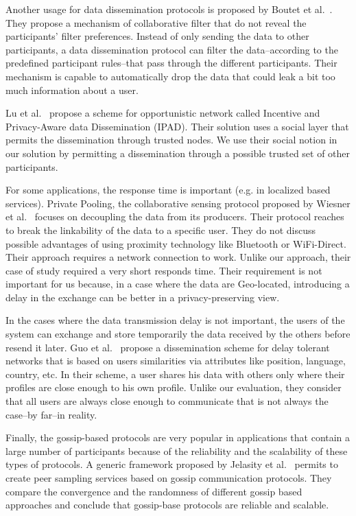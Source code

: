 Another usage for data dissemination protocols is proposed by Boutet et al.~\cite{DBLP:journals/computing/BoutetFGJK16}.
They propose a mechanism of collaborative filter that do not reveal the participants' filter preferences.
Instead of only sending the data to other participants, a data dissemination protocol can filter the data--according to the predefined participant rules--that pass through the different participants.
Their mechanism is capable to automatically drop the data that could leak a bit too much information about a user.

Lu et al.~\cite{DBLP:conf/infocom/LuLSCS13} propose a scheme for opportunistic network called Incentive and Privacy-Aware data Dissemination (IPAD).
Their solution uses a social layer that permits the dissemination through trusted nodes.
We use their social notion in our solution by permitting a dissemination through a possible trusted set of other participants.

For some applications, the response time is important (e.g. in localized based services).
Private Pooling, the collaborative sensing protocol proposed by Wiesner et al.~\cite{DBLP:conf/mobisec/WiesnerDD11} focuses on decoupling the data from its producers.
Their protocol reaches to break the linkability of the data to a specific user.
They do not discuss possible advantages of using proximity technology like Bluetooth or WiFi-Direct.
Their approach requires a network connection to work.
Unlike our approach, their case of study required a very short responds time.
Their requirement is not important for us because, in a case where the data are Geo-located, introducing a delay in the exchange can be better in a privacy-preserving view.

In the cases where the data transmission delay is not important, the users of the system can exchange and store temporarily the data received by the others before resend it later.
Guo et al.~\cite{DBLP:conf/infocom/GuoZYF13} propose a dissemination scheme for delay tolerant networks that is based on users similarities via attributes like position, language, country, etc.
In their scheme, a user shares his data with others only where their profiles are close enough to his own profile.
Unlike our evaluation, they consider that all users are always close enough to communicate that is not always the case--by far--in reality.

Finally, the gossip-based protocols are very popular in applications that contain a large number of participants because of the reliability and the scalability of these types of protocols.
A generic framework proposed by Jelasity et al.~\cite{DBLP:conf/middleware/JelasityGKS04} permits to create peer sampling services based on gossip communication protocols.
They compare the convergence and the randomness of different gossip based approaches and conclude that gossip-base protocols are reliable and scalable.

